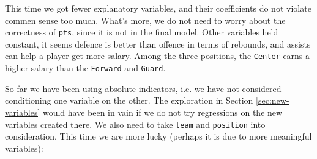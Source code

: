 \documentclass[english]{article}
\begin{document}
This time we got fewer explanatory variables, and their coefficients
do not violate commen sense too much. What's more, we do not need
to worry about the correctness of \texttt{pts}, since it is not in
the final model. Other variables held constant, it seems defence is
better than offence in terms of rebounds, and assists can help a player
get more salary. Among the three positions, the \texttt{Center} earns
a higher salary than the \texttt{Forward} and \texttt{Guard}.

So far we have been using absolute indicators, i.e. we have not considered
conditioning one variable on the other. The exploration in Section
\ref{sec:new-variables} would have been in vain if we do not try
regressions on the new variables created there. We also need to take
\texttt{team} and \texttt{position} into consideration. This time
we are more lucky (perhaps it is due to more meaningful variables):
\end{document}
